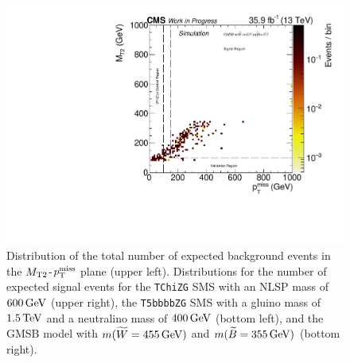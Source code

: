 \begin{figure}[htb]
 \includegraphics[width=\pairwidth]{figures/plots_2d/DataMC_sameHistograms_LL+signal_onZ__LL__MetMt2_SIG_gmsb_415_355_}
 \caption{Distribution of the total number of expected background events in the $M_{\mathrm{T2}}$-$p_{\mathrm{T}}^\text{miss}$ plane (upper left). Distributions for the number of expected signal events for the \texttt{TChiZG} SMS with an NLSP mass of $600\,\text{Ge\hspace{-.08em}V}$ (upper right), the \texttt{T5bbbbZG} SMS with a gluino mass of $1.5\,\text{Te\hspace{-.08em}V}$ and a neutralino mass of $400\,\text{Ge\hspace{-.08em}V}$ (bottom left), and the GMSB model with $m(\widetilde{W}=455\,\text{Ge\hspace{-.08em}V})$ and $m(\widetilde{B}=355\,\text{Ge\hspace{-.08em}V})$ (bottom right).}
 \label{fig:Regions2}
\end{figure}



